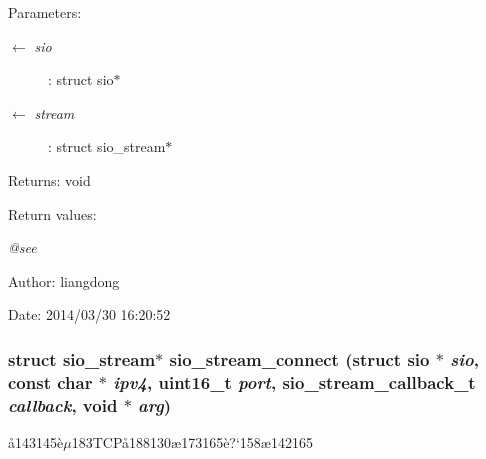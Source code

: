 \begin{Desc}
\item[Parameters:]
\begin{description}
\item[\mbox{$\leftarrow$} {\em sio}]: struct sio$\ast$ \item[\mbox{$\leftarrow$} {\em stream}]: struct sio\_\-stream$\ast$ \end{description}
\end{Desc}
\begin{Desc}
\item[Returns:]void \end{Desc}
\begin{Desc}
\item[Return values:]
\begin{description}
\item[{\em @see}]\end{description}
\end{Desc}
\begin{Desc}
\item[Author:]liangdong \end{Desc}
\begin{Desc}
\item[Date:]2014/03/30 16:20:52 \end{Desc}
\subsubsection{\setlength{\rightskip}{0pt plus 5cm}struct sio\_\-stream$\ast$ sio\_\-stream\_\-connect (struct sio $\ast$ {\em sio}, const char $\ast$ {\em ipv4}, uint16\_\-t {\em port}, sio\_\-stream\_\-callback\_\-t {\em callback}, void $\ast$ {\em arg})}\label{sio__stream_8c_a8}


\aa{}143145\`{e}$\mu$183TCP\aa{}188130\ae{}173165\`{e}?`158\ae{}142165 

